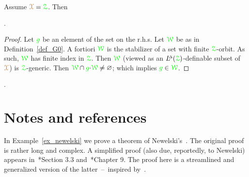\begin{proposition}\label{prop_Z0_inclusione2}
  Assume ${\color{brown}\EuScript X}={\color{green}\EuScript Z}$.
  Then              

  .
  
\end{proposition}


\begin{proof}
  Let ${\color{green} g}$ be an element of the set on the r.h.s.
  Let ${\color{green}\EuScript W}$ be as in Definition~\ref{def_G0}.
  A fortiori ${\color{green}\EuScript W}$ is the stabilizer of a set with finite  ${\color{green}\EuScript Z}$-orbit.
  As such, ${\color{green}\EuScript W}$ has finite index in ${\color{green}\EuScript Z}$.
  Then ${\color{green}\EuScript W}$ (viewed as an $L\kern-.5ex^{\scriptscriptstyle\Delta}({\color{green}\EuScript Z})$-definable subset of ${\color{brown}\EuScript X}$) is ${\color{green}\EuScript Z}$-generic.
  Then ${\color{green}\EuScript W}\cap{\color{green}g}{\cdot}{\color{green}\EuScript W}\neq\varnothing$; which implies ${\color{green} g}\in{\color{green}\EuScript W}$.
 \end{proof}

 \begin{definition}\label{def_G00}\noindent\vspace*{0.1ex}

  .\smallskip

\end{definition}
\section{Notes and references}

In Example~\ref{ex_newelski} we prove a theorem of Newelski's~\cite{Newelski}.
The original proof is rather long and complex.
A simplified proof (also due, reportedly, to Newelski) appears in~\cite{Pelaez}*{Section 3.3} and~\cite{Casanovas}*{Chapter 9}.
The proof here is a streamlined and generalized version of the latter~--~inspired by~\cite{Z16}.

